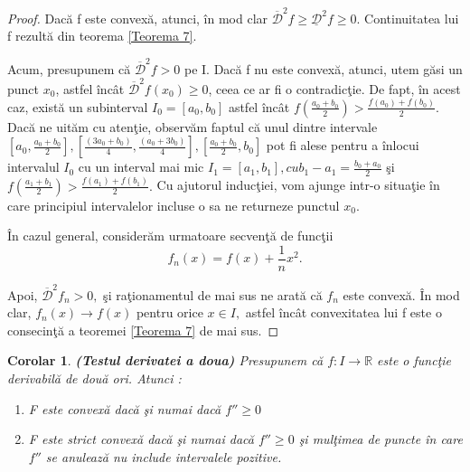 \documentclass[a4paper,12pt,oneside]{report}
\newtheorem{corollary}{Corolar}
\begin{document}
\begin{proof}
Dac\u{a} f este convex\u{a}, atunci, \^{i}n mod clar \(\overline{ \mathcal{D}}^{2}f\geq \underline{\mathcal{D}}^{2}f\geq 0.\) Continuitatea lui f rezult\u{a} din teorema \ref{Teorema 7}. 

Acum, presupunem c\u{a} \(\overline{ \mathcal{D}}^{2}f > 0\) pe I. Dac\u{a} f nu este convex\u{a}, atunci, utem g\u{a}si un punct \(x_{0}\), astfel \^{i}nc\^{a}t \(\overline{ \mathcal{D}}^{2}f \left ( x_{0} \right )\geq 0\), ceea ce ar fi o contradic\c{t}ie. De fapt, \^{i}n acest caz, exist\u{a} un subinterval \(I_{0} = \left [ a_{0}, b_{0} \right ]\) astfel \^{i}nc\^{a}t \(f\left ( \frac{a_{0} + b_{0}}{2} \right )> \frac{f\left ( a_{0} \right ) + f\left ( b_{0} \right )}{2}.\) Dac\u{a} ne uit\u{a}m cu aten\c{t}ie, observ\u{a}m faptul c\u{a} unul dintre intervale \(\left [ a_{0}, \frac{a_{0}+b_{0}}{2} \right ], \left [ \frac{\left ( 3a_{0}+b_{0} \right )}{4},\frac{\left ( a_{0}+3b_{0} \right )}{4} \right ],\left [\frac{a_{0}+b_{0}}{2}, b_{0} \right ]\) pot fi alese pentru a \^{i}nlocui intervalul \(I_{0}\) cu un interval mai mic \(I_{1}= \left [ a_{1}, b_{1} \right ], cu  b_{1} -  a_{1}= \frac{b_{0}+ a_{0}}{2}\) \c{s}i \(f\left ( \frac{a_{1}+b_{1}}{2} \right ) > \frac{f\left ( a_{1} \right ) + f\left ( b_{1} \right )}{2}.\) Cu ajutorul induc\c{t}iei, vom ajunge intr-o situa\c{t}ie \^{i}n care principiul intervalelor incluse o sa ne returneze punctul \(x_{0}.\)

\^{I}n cazul general, consider\u{a}m urmatoare secven\c{t}\u{a} de func\c{t}ii 
\begin{displaymath}
   f_{n}\left ( x \right ) = f\left ( x \right ) + \frac{1}{n}x^{2}.
\end{displaymath}

Apoi, \(\overline{ \mathcal{D}}^{2}f _{n} > 0,\) \c{s}i ra\c{t}ionamentul de mai sus ne arat\u{a} c\u{a} \(f _{n}\) este convex\u{a}. \^{I}n mod clar, \(f _{n}\left ( x \right ) \rightarrow f\left ( x \right )\) pentru orice \(x \in I,\) astfel \^{i}nc\^{a}t convexitatea lui f este o consecin\c{t}\u{a} a teoremei \ref{Teorema 7} de mai sus. 
\end{proof}
 \begin{corollary} \textbf{(Testul derivatei a doua)}
	Presupunem c\u{a} \(f : I \rightarrow \mathbb{R}\) este o func\c{t}ie derivabil\u{a} de dou\u{a} ori. Atunci :
\begin{enumerate}
    \item	F este convex\u{a} dac\u{a} \c{s}i numai dac\u{a} \({f}''\geq 0\)
    \item  F este strict convex\u{a} dac\u{a} \c{s}i numai dac\u{a} \({f}''\geq 0\) \c{s}i mul\c{t}imea de puncte \^{i}n care \({f}''\) se anuleaz\u{a} nu include intervalele pozitive. 
\end{enumerate}
 \end{corollary}
\end{document}
